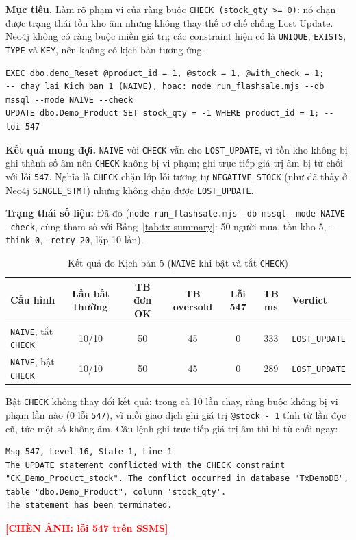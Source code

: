 \textbf{Mục tiêu.} Làm rõ phạm vi của ràng buộc \texttt{CHECK (stock\_qty >= 0)}: nó chặn được trạng thái tồn kho âm nhưng không thay thế cơ chế chống Lost Update. Neo4j không có ràng buộc miền giá trị; các constraint hiện có là \texttt{UNIQUE}, \texttt{EXISTS}, \texttt{TYPE} và \texttt{KEY}, nên không có kịch bản tương ứng.

\begin{lstlisting}[basicstyle=\ttfamily\small, breaklines=true, frame=single]
EXEC dbo.demo_Reset @product_id = 1, @stock = 1, @with_check = 1;
-- chay lai Kich ban 1 (NAIVE), hoac: node run_flashsale.mjs --db mssql --mode NAIVE --check
UPDATE dbo.Demo_Product SET stock_qty = -1 WHERE product_id = 1; -- loi 547
\end{lstlisting}

\textbf{Kết quả mong đợi.} \texttt{NAIVE} với \texttt{CHECK} vẫn cho \texttt{LOST\_UPDATE}, vì tồn kho không bị ghi thành số âm nên \texttt{CHECK} không bị vi phạm; ghi trực tiếp giá trị âm bị từ chối với lỗi \texttt{547}. Nghĩa là \texttt{CHECK} chặn lớp lỗi tương tự \texttt{NEGATIVE\_STOCK} (như đã thấy ở Neo4j \texttt{SINGLE\_STMT}) nhưng không chặn được \texttt{LOST\_UPDATE}.

\textbf{Trạng thái số liệu:} Đã đo (\texttt{node run\_flashsale.mjs --db mssql --mode NAIVE --check}, cùng tham số với Bảng~\ref{tab:tx-summary}: 50 người mua, tồn kho 5, \texttt{--think 0}, \texttt{--retry 20}, lặp 10 lần).

\begin{table}[htbp]
\centering
\caption{Kết quả đo Kịch bản 5 (\texttt{NAIVE} khi bật và tắt \texttt{CHECK})}
\label{tab:tx-kb5}
\renewcommand{\arraystretch}{1.2}
\begin{tabularx}{\textwidth}{l c c c c c X}
\toprule
\textbf{Cấu hình} & \textbf{Lần bất thường} & \textbf{TB đơn OK} & \textbf{TB oversold} & \textbf{Lỗi 547} & \textbf{TB ms} & \textbf{Verdict} \\
\midrule
\texttt{NAIVE}, tắt \texttt{CHECK} & 10/10 & 50 & 45 & 0 & 333 & \texttt{LOST\_UPDATE} \\
\texttt{NAIVE}, bật \texttt{CHECK} & 10/10 & 50 & 45 & 0 & 289 & \texttt{LOST\_UPDATE} \\
\bottomrule
\end{tabularx}
\end{table}

Bật \texttt{CHECK} không thay đổi kết quả: trong cả 10 lần chạy, ràng buộc không bị vi phạm lần nào (0 lỗi \texttt{547}), vì mỗi giao dịch ghi giá trị \texttt{@stock - 1} tính từ lần đọc cũ, tức một số không âm. Câu lệnh ghi trực tiếp giá trị âm thì bị từ chối ngay:
\begin{lstlisting}[basicstyle=\ttfamily\footnotesize, breaklines=true, frame=single]
Msg 547, Level 16, State 1, Line 1
The UPDATE statement conflicted with the CHECK constraint "CK_Demo_Product_stock". The conflict occurred in database "TxDemoDB", table "dbo.Demo_Product", column 'stock_qty'.
The statement has been terminated.
\end{lstlisting}
\textcolor{red}{\textbf{[CHÈN ẢNH: lỗi 547 trên SSMS]}}

